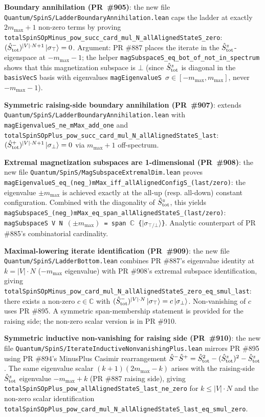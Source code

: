 \documentclass[a4paper,11pt]{article}
\begin{document}
\textbf{Boundary annihilation (PR~\#905)}: the new file
\texttt{Quantum/SpinS/LadderBoundaryAnnihilation.lean} caps the
ladder at exactly $2m_{\max}+1$ non-zero terms by proving
\texttt{totalSpinSOpMinus\_pow\_succ\_card\_mul\_N\_allAlignedStateS\_zero}:
$(\hat S^-_{\rm tot})^{|V|\cdot N + 1}\,|\sigma_\top\rangle = 0$.
Argument: PR \#887 places the iterate in the
$\hat S^z_{\rm tot}$-eigenspace at $-m_{\max}-1$; the helper
\texttt{magSubspaceS\_eq\_bot\_of\_not\_in\_spectrum} shows that
this magnetization subspace is $\bot$ (since $\hat S^z_{\rm tot}$
is diagonal in the \texttt{basisVecS} basis with eigenvalues
\texttt{magEigenvalueS}~$\sigma \in [-m_{\max}, m_{\max}]$, never
$-m_{\max}-1$).

\textbf{Symmetric raising-side boundary annihilation (PR~\#907)}:
extends \texttt{Quantum/SpinS/LadderBoundaryAnnihilation.lean} with
\texttt{magEigenvalueS\_ne\_mMax\_add\_one} and
\texttt{totalSpinSOpPlus\_pow\_succ\_card\_mul\_N\_allAlignedStateS\_last}:
$(\hat S^+_{\rm tot})^{|V|\cdot N + 1}\,|\sigma_\bot\rangle = 0$
via $m_{\max}+1$ off-spectrum.

\textbf{Extremal magnetization subspaces are 1-dimensional
(PR~\#908)}: the new file
\texttt{Quantum/SpinS/MagSubspaceExtremalDim.lean} proves
\texttt{magEigenvalueS\_eq\_(neg\_)mMax\_iff\_allAlignedConfigS\_(last/zero)}:
the eigenvalue $\pm m_{\max}$ is achieved exactly at the all-up
(resp. all-down) constant configuration. Combined with the
diagonality of $\hat S^z_{\rm tot}$, this yields
\texttt{magSubspaceS\_(neg\_)mMax\_eq\_span\_allAlignedStateS\_(last/zero)}:
\texttt{magSubspaceS V N $(\pm m_{\max})$ = span $\mathbb{C}$
\{$|\sigma_{\top/\bot}\rangle$\}}. Analytic counterpart of PR \#885's
combinatorial cardinality.

\textbf{Maximal-lowering iterate identification (PR~\#909)}: the new
file \texttt{Quantum/SpinS/LadderBottom.lean} combines PR \#887's
eigenvalue identity at $k = |V|\cdot N$ ($-m_{\max}$ eigenvalue)
with PR \#908's extremal subspace identification, giving
\texttt{totalSpinSOpMinus\_pow\_card\_mul\_N\_allAlignedStateS\_zero\_eq\_smul\_last}:
there exists a non-zero $c\in\mathbb{C}$ with
$(\hat S^-_{\rm tot})^{|V|\cdot N}\,|\sigma_\top\rangle =
c\,|\sigma_\bot\rangle$. Non-vanishing of $c$ uses PR \#895.
A symmetric span-membership statement is provided for the raising
side; the non-zero scalar version is in PR \#910.

\textbf{Symmetric inductive non-vanishing for raising side
(PR~\#910)}: the new file
\texttt{Quantum/SpinS/IterateInductiveNonvanishingPlus.lean} mirrors
PR \#895 using PR \#894's MinusPlus Casimir rearrangement
$\hat S^- \hat S^+ = \hat S_{\rm tot}^2 - (\hat S^z_{\rm tot})^2 -
\hat S^z_{\rm tot}$. The same eigenvalue scalar $(k+1)(2m_{\max}-k)$
arises with the raising-side $\hat S^z_{\rm tot}$ eigenvalue
$-m_{\max}+k$ (PR \#887 raising side), giving
\texttt{totalSpinSOpPlus\_pow\_allAlignedStateS\_last\_ne\_zero} for
$k\leq|V|\cdot N$ and the non-zero scalar identification
\texttt{totalSpinSOpPlus\_pow\_card\_mul\_N\_allAlignedStateS\_last\_eq\_smul\_zero}.
\end{document}
